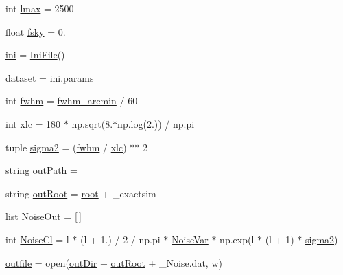 \begin{DoxyCompactItemize}
\item 
int \mbox{\hyperlink{namespacemakePerfectForecastDataset_ac704381699be35d3222c94d38350b547}{lmax}} = 2500
\item 
float \mbox{\hyperlink{namespacemakePerfectForecastDataset_a2d3677da7957f174f3869bc460087591}{fsky}} = 0.
\item 
\mbox{\hyperlink{namespacemakePerfectForecastDataset_a41ac47e208a3788dd1b5df37582457f1}{ini}} = \mbox{\hyperlink{classgetdist_1_1inifile_1_1IniFile}{Ini\+File}}()
\item 
\mbox{\hyperlink{namespacemakePerfectForecastDataset_a333367b7a8e482ec7b83be682e7d7c10}{dataset}} = ini.\+params
\item 
int \mbox{\hyperlink{namespacemakePerfectForecastDataset_aff69188f85ce4067ad5f87e6b1b4a9c9}{fwhm}} = \mbox{\hyperlink{namespacemakePerfectForecastDataset_adf5c2024ddb72d322a72ff26899cccca}{fwhm\+\_\+arcmin}} / 60
\item 
int \mbox{\hyperlink{namespacemakePerfectForecastDataset_ab11003fb8a8c895cfe8d425639dde9cc}{xlc}} = 180 $\ast$ np.\+sqrt(8.$\ast$np.\+log(2.)) / np.\+pi
\item 
tuple \mbox{\hyperlink{namespacemakePerfectForecastDataset_adeabcd27069a59a0a0f602925dd8a04d}{sigma2}} = (\mbox{\hyperlink{namespacemakePerfectForecastDataset_aff69188f85ce4067ad5f87e6b1b4a9c9}{fwhm}} / \mbox{\hyperlink{namespacemakePerfectForecastDataset_ab11003fb8a8c895cfe8d425639dde9cc}{xlc}}) $\ast$$\ast$ 2
\item 
string \mbox{\hyperlink{namespacemakePerfectForecastDataset_ad442987d13577b78bf1e9eaa042cc199}{out\+Path}} = \textquotesingle{}\textquotesingle{}
\item 
string \mbox{\hyperlink{namespacemakePerfectForecastDataset_a04ad14c3351c769492bc637ac30f91eb}{out\+Root}} = \mbox{\hyperlink{namespacemakePerfectForecastDataset_af7e5dd18868fb897809f1a029858e619}{root}} + \textquotesingle{}\+\_\+exactsim\textquotesingle{}
\item 
list \mbox{\hyperlink{namespacemakePerfectForecastDataset_a49ad231f917d0099bdc0a55e8e8c4167}{Noise\+Out}} = \mbox{[}$\,$\mbox{]}
\item 
int \mbox{\hyperlink{namespacemakePerfectForecastDataset_a1e43f7edfc6e37d5c9804b614ceb9977}{Noise\+Cl}} = l $\ast$ (l + 1.) / 2 / np.\+pi $\ast$ \mbox{\hyperlink{namespacemakePerfectForecastDataset_a1787b5246cb8a0c46d008fe173eef0b6}{Noise\+Var}} $\ast$ np.\+exp(l $\ast$ (l + 1) $\ast$ \mbox{\hyperlink{namespacemakePerfectForecastDataset_adeabcd27069a59a0a0f602925dd8a04d}{sigma2}})
\item 
\mbox{\hyperlink{namespacemakePerfectForecastDataset_a1b67162d688442b80ecddecd3f8cb083}{outfile}} = open(\mbox{\hyperlink{namespacemakePerfectForecastDataset_af7ebda3a1c64cc6cec0a262a523b811f}{out\+Dir}} + \mbox{\hyperlink{namespacemakePerfectForecastDataset_a04ad14c3351c769492bc637ac30f91eb}{out\+Root}} + \textquotesingle{}\+\_\+\+Noise.\+dat\textquotesingle{}, \textquotesingle{}w\textquotesingle{})
\end{DoxyCompactItemize}



